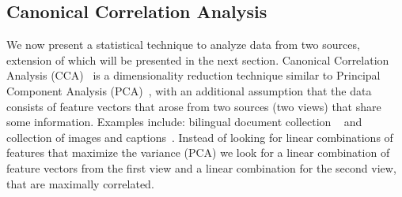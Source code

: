 \documentclass[twoside,11pt]{article}
\begin{document}
\subsection{Canonical Correlation Analysis}\label{sec:CCA}
 We now present a statistical technique to analyze data from two sources, extension of which will be presented in the next section.
%
 Canonical Correlation Analysis (CCA)~\cite{Hotelling} is a dimensionality reduction technique similar to Principal Component Analysis (PCA)~\cite{Pearson1901On}, with an additional assumption that the data consists of feature vectors that arose from two sources (two views) that share some information. Examples include: bilingual document collection ~ and collection of images and captions~. Instead of looking for linear combinations of features that maximize the variance (PCA) we look for a linear combination of feature vectors from the first view and a linear combination for the second view, that are maximally correlated.
\end{document}
